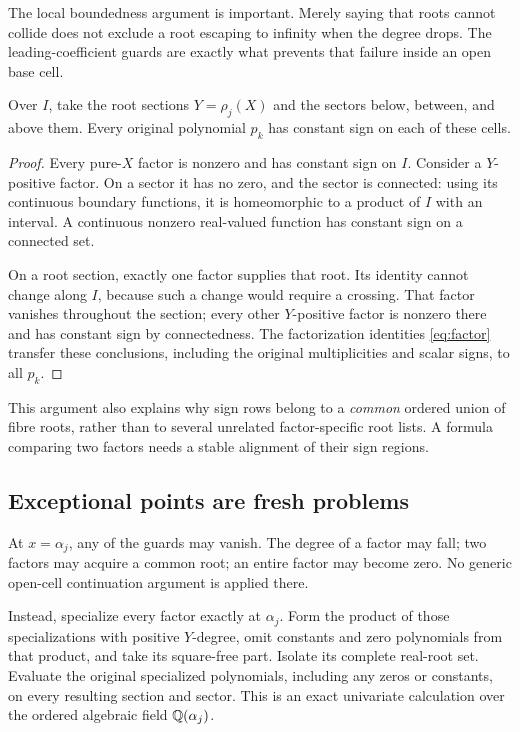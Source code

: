 The local boundedness argument is important. Merely saying that roots cannot collide does not exclude a root escaping to infinity when the degree drops. The leading-coefficient guards are exactly what prevents that failure inside an open base cell.

\begin{theorem}\label{thm:sign-atlas}
Over $I$, take the root sections $Y=\rho_j(X)$ and the sectors below, between, and above them. Every original polynomial $p_k$ has constant sign on each of these cells.
\end{theorem}
\begin{proof}
Every pure-$X$ factor is nonzero and has constant sign on $I$. Consider a $Y$-positive factor. On a sector it has no zero, and the sector is connected: using its continuous boundary functions, it is homeomorphic to a product of $I$ with an interval. A continuous nonzero real-valued function has constant sign on a connected set.

On a root section, exactly one factor supplies that root. Its identity cannot change along $I$, because such a change would require a crossing. That factor vanishes throughout the section; every other $Y$-positive factor is nonzero there and has constant sign by connectedness. The factorization identities \eqref{eq:factor} transfer these conclusions, including the original multiplicities and scalar signs, to all $p_k$.
\end{proof}

This argument also explains why sign rows belong to a \emph{common} ordered union of fibre roots, rather than to several unrelated factor-specific root lists. A formula comparing two factors needs a stable alignment of their sign regions.

\subsection{Exceptional points are fresh problems}
At $x=\alpha_j$, any of the guards may vanish. The degree of a factor may fall; two factors may acquire a common root; an entire factor may become zero. No generic open-cell continuation argument is applied there.

Instead, specialize every factor exactly at $\alpha_j$. Form the product of those specializations with positive $Y$-degree, omit constants and zero polynomials from that product, and take its square-free part. Isolate its complete real-root set. Evaluate the original specialized polynomials, including any zeros or constants, on every resulting section and sector. This is an exact univariate calculation over the ordered algebraic field $\mathbb Q(\alpha_j)$.

